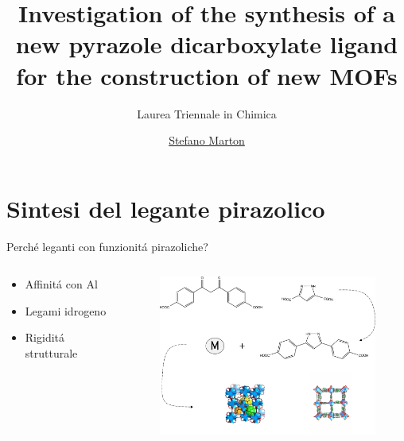 \documentclass{beamer}
\title{\large{Investigation of the synthesis of a new pyrazole dicarboxylate ligand for the construction of new MOFs}}
\subtitle{Laurea Triennale in Chimica}
\author{\href{stefano.marton@studenti.unimi.it}{Stefano Marton}}
\begin{document}
\maketitle

\section{Sintesi del legante pirazolico}

\setlength{\columnsep}{0.2cm}
\begin{frame}{Perché leganti con funzionitá pirazoliche?}
	\begin{columns}
		\hspace{1cm}
		\begin{column}{0.3\textwidth}
			\begin{itemize}
				\item Affinitá con Al
				\item Legami idrogeno
				\item Rigiditá strutturale
			\end{itemize}
		\end{column}
		\hspace{-1cm}
		\begin{column}{0.7\textwidth}
			\begin{figure}[h]
				\includegraphics[width=8cm,keepaspectratio]{illustration/drawing2.pdf}
			\end{figure}
		\end{column}
	\end{columns}
\end{frame}
\end{document}
